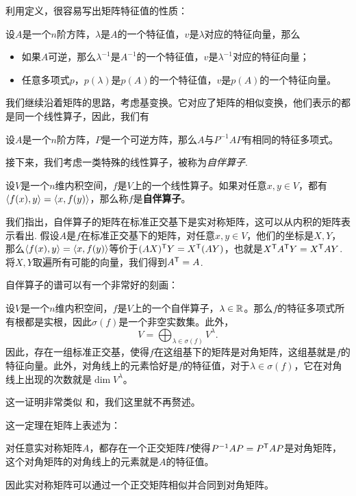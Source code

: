 利用定义，很容易写出矩阵特征值的性质：
\begin{proposition}
设$A$是一个$n$阶方阵，$\lambda$是$A$的一个特征值，$v$是$\lambda$对应的特征向量，那么
\begin{itemize}
    \item 如果$A$可逆，那么$\lambda^{-1}$是$A^{-1}$的一个特征值，$v$是$\lambda^{-1}$对应的特征向量；
    \item 任意多项式$p$，$p(\lambda)$是$p(A)$的一个特征值，$v$是$p(A)$的一个特征向量。
\end{itemize}
\end{proposition}

我们继续沿着矩阵的思路，考虑基变换。它对应了矩阵的相似变换，他们表示的都是同一个线性算子，因此，我们有

\begin{proposition}\label{prop:similar-matrix-same-characteristic-polynomial}
    设$A$是一个$n$阶方阵，$P$是一个可逆方阵，那么$A$与$P^{-1}AP$有相同的特征多项式。
\end{proposition}

接下来，我们考虑一类特殊的线性算子，被称为\emph{自伴算子}.

\begin{definition}[自伴算子]
设$V$是一个$n$维内积空间，$f$是$V$上的一个线性算子。如果对任意$x,y\in V$，都有$\left\langle{f(x)},{y}\right\rangle=\left\langle{x},{f(y)}\right\rangle$，那么称$f$是\textbf{自伴算子}。
\end{definition}
我们指出，自伴算子的矩阵在标准正交基下是实对称矩阵，这可以从内积的矩阵表示看出. 假设$A$是$f$在标准正交基下的矩阵，对任意$x,y\in V$，他们的坐标是$X,Y$，那么$\left\langle{f(x)},{y}\right\rangle=\left\langle{x},{f(y)}\right\rangle$等价于$(AX)^{\mathsf{T}} Y=X^{\mathsf{T}}(AY)$，也就是$X^{\mathsf{T}} A^{\mathsf{T}} Y=X^{\mathsf{T}} AY$. 将$X,Y$取遍所有可能的向量，我们得到$A^{\mathsf{T}}=A$.

自伴算子的谱可以有一个非常好的刻画：
\begin{theorem}\label{thm:symmetric-operator-spectrum}
    设$V$是一个$n$维内积空间，$f$是$V$上的一个自伴算子，$\lambda\in\mathbb{R}$。那么$f$的特征多项式所有根都是实根，因此$\sigma(f)$是一个非空实数集。此外，
    \[V=\bigoplus_{\lambda\in\sigma(f)}V^\lambda.\]
    因此，存在一组标准正交基，使得$f$在这组基下的矩阵是对角矩阵，这组基就是$f$的特征向量。此外，对角线上的元素恰好是$f$的特征值，对于$\lambda\in\sigma(f)$，它在对角线上出现的次数就是$\dim V^\lambda$。
\end{theorem}
这一证明非常类似 和，我们这里就不再赘述。

这一定理在矩阵上表述为：
\begin{corollary}\label{cor:symmetric-matrix-spectrum}
对任意实对称矩阵$A$，都存在一个正交矩阵$P$使得$P^{-1}AP=P^{\mathsf{T}} AP$是对角矩阵，这个对角矩阵的对角线上的元素就是$A$的特征值。
\end{corollary}
因此实对称矩阵可以通过一个正交矩阵相似并合同到对角矩阵。


